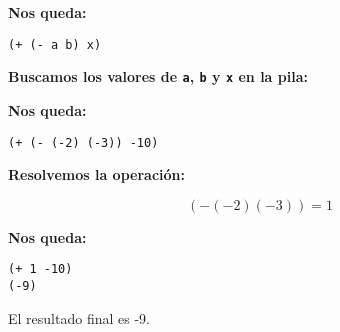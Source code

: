 \textbf{Nos queda:}
\begin{verbatim}
(+ (- a b) x)
\end{verbatim}

\textbf{Buscamos los valores de \texttt{a}, \texttt{b} y \texttt{x} en la pila:}

\vspace{.3cm}

\textbf{Nos queda:}
\begin{verbatim}
(+ (- (-2) (-3)) -10)
\end{verbatim}

\textbf{Resolvemos la operación:}

\[
(- (-2) (-3)) = 1
\]

\textbf{Nos queda:}
\begin{verbatim}
(+ 1 -10)
(-9)
\end{verbatim}

El resultado final es -9.
